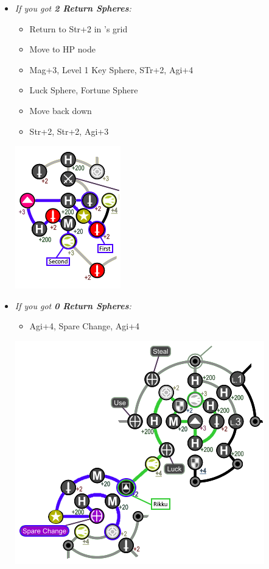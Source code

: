 \begin{spheregrid}
\begin{multicols}{2}
\begin{itemize}
\begin{itemize}
                    \columnbreak
              \item \textit{If you got \textbf{2 Return Spheres}:}
                    \begin{itemize}
                      \item Return to Str+2 in \wakka's grid
                      \item Move to HP node
                      \item Mag+3, Level 1 Key Sphere, STr+2, Agi+4
                      \item Luck Sphere, Fortune Sphere
                      \item Move back down
                      \item Str+2, Str+2, Agi+3
                    \end{itemize}
                    \includegraphics[width=.5\columnwidth]{graphics/2_and_2_with_luck}
              \item \textit{If you got \textbf{0 Return Spheres}:}
                    \begin{itemize}
                      \rikkuf Move to the MDef Node below Agi+4 below you
                      \yunaf Friend Sphere to \rikku
                      \item Agi+4, Spare Change, Agi+4
                    \end{itemize}
                    \includegraphics[width=.7\columnwidth]{graphics/0_return_w_luck}

\end{itemize}
\end{itemize}
\end{multicols}
\end{spheregrid}
